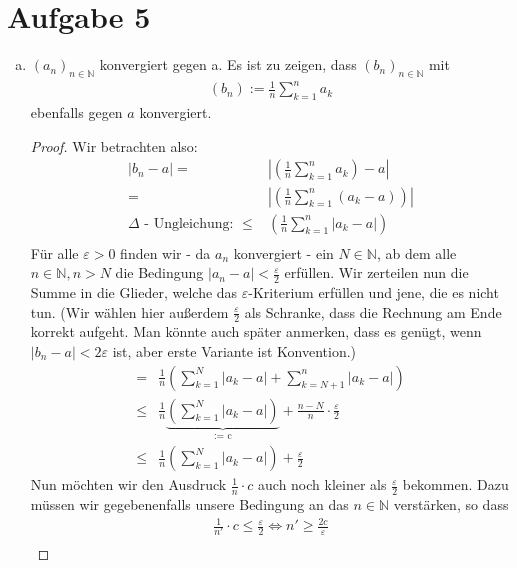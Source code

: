 \documentclass{scrreprt}
\newcommand{\NN}{\mathbb{N}}
\begin{document}
	\section*{Aufgabe 5}
		\begin{enumerate}[(a)]
			\item
				$(a_n)_{n \in \NN}$ konvergiert gegen a. Es ist zu zeigen, dass $(b_n)_{n \in \NN}$ mit
				\begin{align*}
					(b_n) := \frac{1}{n} \sum\limits_{k = 1}^{n} a_k
				\end{align*}
				ebenfalls gegen $a$ konvergiert.
				\begin{proof} Wir betrachten also:
				\begin{align*}
					|b_n - a| = &\left|\left(\frac{1}{n} \sum\limits_{k=1}^{n} a_k \right) - a \right| \\
					= & \left|\left( \frac{1}{n} \sum\limits_{k=1}^{n} (a_k - a) \right) \right|\\
					\text{$\Delta$ - Ungleichung: }\leq & \left( \frac{1}{n} \sum\limits_{k=1}^{n} |a_k - a| \right)\\
				\end{align*}
				Für alle $\varepsilon > 0$ finden wir - da $a_n$ konvergiert - ein $N \in \NN$, ab dem alle $n \in \NN, n > N$ die Bedingung $|a_n - a| < \frac{\varepsilon}{2}$ erfüllen. Wir zerteilen nun die Summe in die Glieder, welche das $\varepsilon$-Kriterium erfüllen und jene, die es nicht tun. (Wir wählen hier außerdem $\frac{\varepsilon}{2}$ als Schranke, dass die Rechnung am Ende korrekt aufgeht. Man könnte auch später anmerken, dass es genügt, wenn $|b_n - a| < 2\varepsilon$ ist, aber erste Variante ist Konvention.)
				\begin{align*}
					= & \frac{1}{n} \left( \sum\limits_{k=1}^{N} |a_k - a| + \sum\limits_{k=N + 1}^{n} |a_k - a| \right)\\
					\leq &  \frac{1}{n} \underbrace{\left(\sum\limits_{k=1}^{N} |a_k - a|\right)}_\text{:= c}  + \frac{n - N}{n} \cdot \frac{\varepsilon}{2}\\
					\leq &  \frac{1}{n} \left(\sum\limits_{k=1}^{N} |a_k - a|\right)  + \frac{\varepsilon}{2}
				\end{align*}
				Nun möchten wir den Ausdruck $\frac{1}{n} \cdot c$ auch noch kleiner als $\frac{\varepsilon}{2}$ bekommen. Dazu müssen wir gegebenenfalls unsere Bedingung an das $n \in \NN$ verstärken, so dass
				\begin{align*}
					\frac{1}{n'} \cdot c  \leq  \frac{\varepsilon}{2} \Leftrightarrow  n'  \geq \frac{2c}{\varepsilon}\\

\end{align*}
\end{proof}
\end{enumerate}
\end{document}
